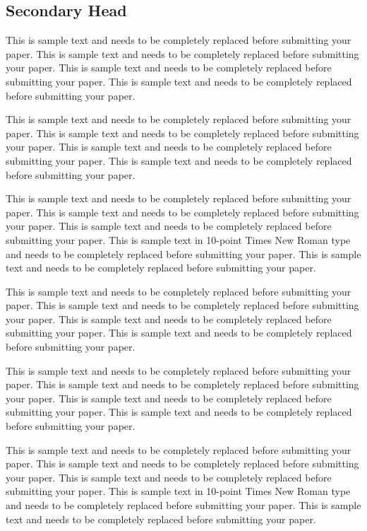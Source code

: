 \documentclass{../../tex_template/asaproc}
\begin{document}
\subsection{Secondary Head}

This is sample text and needs to be completely replaced before submitting your paper. This is sample text and needs to be completely replaced before submitting your paper. This is sample text and needs to be completely replaced before submitting your paper. This is sample text and needs to be completely replaced before submitting your paper.

This is sample text and needs to be completely replaced before submitting your paper. This is sample text and needs to be completely replaced before submitting your paper.  This is sample text and needs to be completely replaced before submitting your paper. This is sample text and needs to be completely replaced before submitting your paper.

This is sample text and needs to be completely replaced before submitting your paper. This is sample text and needs to be completely replaced before submitting your paper. This is sample text and needs to be completely replaced before submitting your paper. This is sample text in 10-point Times New Roman type and needs to be completely replaced before submitting your paper. This is sample text and needs to be completely replaced before submitting your paper.

This is sample text and needs to be completely replaced before submitting your paper. This is sample text and needs to be completely replaced before submitting your paper. This is sample text and needs to be completely replaced before submitting your paper. This is sample text and needs to be completely replaced before submitting your paper.

This is sample text and needs to be completely replaced before submitting your paper. This is sample text and needs to be completely replaced before submitting your paper.  This is sample text and needs to be completely replaced before submitting your paper. This is sample text and needs to be completely replaced before submitting your paper.

This is sample text and needs to be completely replaced before submitting your paper. This is sample text and needs to be completely replaced before submitting your paper. This is sample text and needs to be completely replaced before submitting your paper. This is sample text in 10-point Times New Roman type and needs to be completely replaced before submitting your paper. This is sample text and needs to be completely replaced before submitting your paper.
\end{document}
